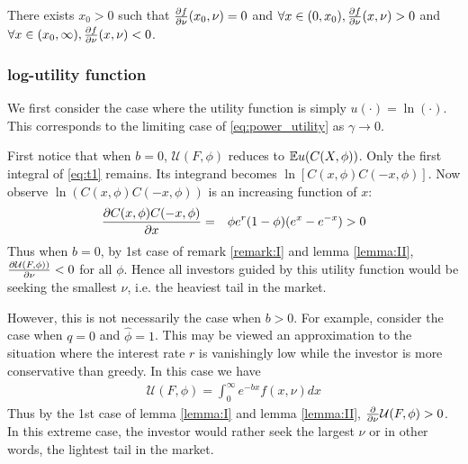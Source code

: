 \documentclass{article}
\begin{document}
\begin{lemma}
  \label{lemma:II}
  There exists $x_0 > 0$ such that $\frac{\partial f}{\partial \nu}(x_0, \nu) = 0$ and
  $\forall x \in (0, x_0), \frac{\partial f}{\partial \nu}(x, \nu) > 0$ and
  $\forall x \in (x_0, \infty), \frac{\partial f}{\partial \nu}(x, \nu) < 0$.
\end{lemma}

\subsubsection{log-utility function}
We first consider the case where the utility function is simply
$u(\cdot) = \ln(\cdot)$. This corresponds to the limiting case of
\eqref{eq:power_utility} as $\gamma \to 0$.

First notice that when $b = 0$, $\mathcal U(F, \phi)$ reduces to
$\mathbb{E} u(C(X, \phi))$. Only the first integral of \eqref{eq:t1} remains.
Its integrand becomes $\ln[C(x, \phi) C(-x, \phi)]$.
Now observe $\ln(C(x, \phi)C(-x, \phi))$ is an increasing function of
$x$:
\begin{eqnarray*}
  \frac{\partial C(x, \phi) C(-x, \phi)}{\partial x}
  &=&
  \phi e^r (1 - \phi) (e^x - e^{-x}) > 0
\end{eqnarray*}
Thus when $b = 0$, by 1st case of remark \ref{remark:I} and lemma
\ref{lemma:II},
$\frac{\partial \mathcal U(F, \phi))}{\partial \nu} < 0$ for all $\phi$. Hence all
investors guided by this utility function would be seeking the
smallest $\nu$, i.e. the heaviest tail in the market.

However, this is not necessarily the case when $b > 0$. For example,
consider the case when $q = 0$ and $\hat\phi = 1$. This may be
viewed an approximation to the situation where the interest rate $r$ is
vanishingly low while the investor is more conservative than
greedy. In this case we have
\begin{eqnarray*}
  \mathcal U(F, \phi) = \int_{0}^{\infty} e^{-b x} f(x, \nu) dx
\end{eqnarray*}
Thus by the 1st case of lemma \ref{lemma:I} and lemma \ref{lemma:II},
$\frac{\partial}{\partial \nu}\mathcal U(F, \phi) > 0$. In this extreme case, the investor
would rather seek the largest $\nu$ or in other words, the lightest
tail in the market.
\end{document}
